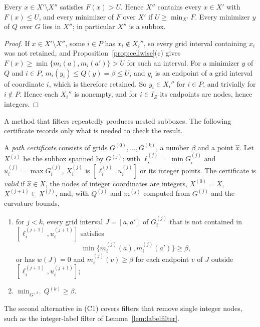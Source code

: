 \begin{proposition}\label{prop:filter}
Every $x\in X'\setminus X''$ satisfies $F(x)>U$. Hence $X''$ contains every
$x\in X'$ with $F(x)\le U$, and every minimizer of $F$ over $X'$ if
$U\ge\min_{X'}F$. Every minimizer $y$ of $Q$ over $G$ lies in $X''$; in
particular $X''$ is a subbox.
\end{proposition}

\begin{proof}
If $x\in X'\setminus X''$, some $i\in P$ has $x_i\notin X_i''$, so every grid
interval containing $x_i$ was not retained, and
Proposition~\ref{prop:cellwise}(c) gives $F(x)\ge\min\{m_i(a),m_i(a')\}>U$
for such an interval. For a minimizer $y$ of $Q$ and $i\in P$,
$m_i(y_i)\le Q(y)=\beta\le U$, and $y_i$ is an endpoint of a grid interval of
coordinate $i$, which is therefore retained. So $y_i\in X_i''$ for $i\in P$,
and trivially for $i\notin P$. Hence each $X_i''$ is nonempty, and for
$i\in I_Z$ its endpoints are nodes, hence integers.
\end{proof}

A method that filters repeatedly produces nested subboxes. The following
certificate records only what is needed to check the result.

\begin{definition}\label{def:cert}
A \emph{path certificate} consists of grids $G^{(0)},\dots,G^{(k)}$, a number
$\beta$ and a point $\hat x$. Let $X^{(j)}$ be the subbox spanned by
$G^{(j)}$: with $\ell_i^{(j)}=\min G_i^{(j)}$ and $u_i^{(j)}=\max G_i^{(j)}$,
$X^{(j)}_i$ is $[\ell_i^{(j)},u_i^{(j)}]$ or its integer points. The
certificate is \emph{valid} if $\hat x\in X$, the nodes of integer coordinates
are integers, $X^{(0)}=X$, $X^{(j+1)}\subseteq X^{(j)}$, and, with $Q^{(j)}$
and $m^{(j)}$ computed from $G^{(j)}$ and the curvature bounds,
\begin{enumerate}[label=(C\arabic*)]
\item for $j<k$, every grid interval $J=[a,a']$ of $G^{(j)}_i$ that is not
contained in $[\ell_i^{(j+1)},u_i^{(j+1)}]$ satisfies
\[
\min\bigl\{m^{(j)}_i(a),m^{(j)}_i(a')\bigr\}\ge\beta ,
\]
or has $w(J)=0$ and $m^{(j)}_i(v)\ge\beta$ for each endpoint $v$ of $J$
outside $[\ell_i^{(j+1)},u_i^{(j+1)}]$;
\item $\min_{G^{(k)}}Q^{(k)}\ge\beta$.
\end{enumerate}
\end{definition}

The second alternative in (C1) covers filters that remove single integer
nodes, such as the integer-label filter of Lemma~\ref{lem:labelfilter}.

